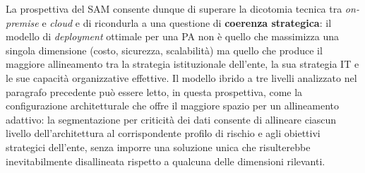 La prospettiva del SAM consente dunque di superare la dicotomia tecnica tra \textit{on-premise} e \textit{cloud} e di ricondurla a una questione di \textbf{coerenza strategica}: il modello di \textit{deployment} ottimale per una PA non è quello che massimizza una singola dimensione (costo, sicurezza, scalabilità) ma quello che produce il maggiore allineamento tra la strategia istituzionale dell'ente, la sua strategia IT e le sue capacità organizzative effettive. Il modello ibrido a tre livelli analizzato nel paragrafo precedente può essere letto, in questa prospettiva, come la configurazione architetturale che offre il maggiore spazio per un allineamento adattivo: la segmentazione per criticità dei dati consente di allineare ciascun livello dell'architettura al corrispondente profilo di rischio e agli obiettivi strategici dell'ente, senza imporre una soluzione unica che risulterebbe inevitabilmente disallineata rispetto a qualcuna delle dimensioni rilevanti.
